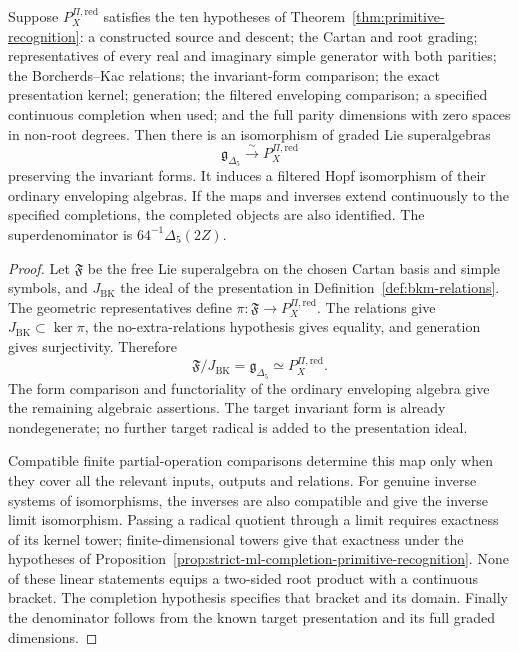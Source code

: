 \begin{theorem}
\label{thm:ch6-primitive-recognition}
Suppose \(P_X^{\Pi,\mathrm{red}}\) satisfies the ten hypotheses of
Theorem~\ref{thm:primitive-recognition}: a constructed source and
descent; the Cartan and root grading; representatives of every real
and imaginary simple generator with both parities; the
Borcherds--Kac relations; the invariant-form comparison; the exact
presentation kernel; generation; the filtered enveloping comparison;
a specified continuous completion when used; and the full parity
dimensions with zero spaces in non-root degrees.
Then there is an isomorphism of graded Lie superalgebras
\[
 \mathfrak g_{\Delta_5}\xrightarrow{\sim}
 P_X^{\Pi,\mathrm{red}}
\]
preserving the invariant forms.  It induces a filtered Hopf
isomorphism of their ordinary enveloping algebras.  If the maps and
inverses extend continuously to the specified completions, the
completed objects are also identified.  The superdenominator is
\(64^{-1}\Delta_5(2Z)\).
\end{theorem}
\begin{proof}
Let \(\mathfrak F\) be the free Lie superalgebra on the chosen
Cartan basis and simple symbols, and \(J_{\mathrm{BK}}\) the ideal
of the presentation in Definition~\ref{def:bkm-relations}.
The geometric representatives define
\(\pi:\mathfrak F\to P_X^{\Pi,\mathrm{red}}\).
The relations give \(J_{\mathrm{BK}}\subset\ker\pi\), the
no-extra-relations hypothesis gives equality, and generation gives
surjectivity.  Therefore
\[
 \mathfrak F/J_{\mathrm{BK}}
 =\mathfrak g_{\Delta_5}\simeq P_X^{\Pi,\mathrm{red}}.
\]
The form comparison and functoriality of the ordinary enveloping
algebra give the remaining algebraic assertions.  The target
invariant form is already nondegenerate; no further target radical
is added to the presentation ideal.

Compatible finite partial-operation comparisons determine this map
only when they cover all the relevant inputs, outputs and relations.
For genuine inverse systems of isomorphisms, the inverses are also
compatible and give the inverse limit isomorphism.  Passing a radical
quotient through a limit requires exactness of its kernel tower;
finite-dimensional towers give that exactness under the hypotheses
of Proposition~\ref{prop:strict-ml-completion-primitive-recognition}.
None of these linear statements equips a two-sided root product
with a continuous bracket.  The completion hypothesis specifies
that bracket and its domain.  Finally the denominator follows from
the known target presentation and its full graded dimensions.
\end{proof}

